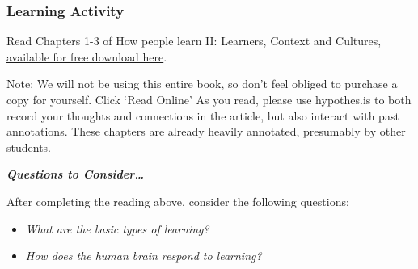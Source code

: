 \documentclass[
]{book}
\providecommand{\tightlist}{%
  \setlength{\itemsep}{0pt}\setlength{\parskip}{0pt}}
\begin{document}
\begin{reflect}
\hypertarget{learning-activity-9}{%
\subsubsection*{Learning Activity}\label{learning-activity-9}}

Read Chapters 1-3 of How people learn II: Learners, Context and Cultures, \href{https://www.nap.edu/catalog/24783}{available for free download here}.

Note: We will not be using this entire book, so don't feel obliged to purchase a copy for yourself.
Click `Read Online' As you read, please use hypothes.is to both record your thoughts and connections in the article, but also interact with past annotations. These chapters are already heavily annotated, presumably by other students.

\textbf{\emph{Questions to Consider\ldots{}}}

After completing the reading above, consider the following questions:

\begin{itemize}
\tightlist
\item
  \emph{What are the basic types of learning?}
\item
  \emph{How does the human brain respond to learning?}
\end{itemize}
\end{reflect}
\end{document}
